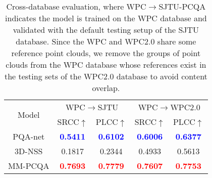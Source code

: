 \documentclass{article}
\begin{document}
\begin{table}[t]\small
    \centering
    
    \begin{tabular}{c|cc|cc}
    \toprule
    \multirow{2}{*}{Model}  & \multicolumn{2}{c|}{WPC$\rightarrow$SJTU} & \multicolumn{2}{c}{WPC$\rightarrow$WPC2.0} \\ \cline{2-5}
            & SRCC$\uparrow$    & PLCC$\uparrow$   & SRCC$\uparrow$   & PLCC$\uparrow$ \\ \hline
        PQA-net       & \bf\textcolor{blue}{0.5411} & \bf\textcolor{blue}{0.6102} & \bf\textcolor{blue}{0.6006} & \bf\textcolor{blue}{0.6377}\\
        3D-NSS        & 0.1817 & 0.2344 & 0.4933 & 0.5613\\ 
        MM-PCQA       & \bf\textcolor{red}{0.7693}   & \bf\textcolor{red}{0.7779}    &\bf\textcolor{red}{0.7607}    & \bf\textcolor{red}{0.7753}\\     
    \bottomrule
    \end{tabular}
    \caption{Cross-database evaluation, where WPC$\rightarrow$SJTU-PCQA indicates the model is trained on the WPC database and validated with the default testing setup of the SJTU database. Since the WPC and WPC2.0 share some reference point clouds, we remove the groups of point clouds from the WPC database whose references exist in the testing sets of the WPC2.0 database to avoid content overlap.}
    \label{tab:crossdatabase}
    \vspace{-0.2cm}
\end{table}
\end{document}

